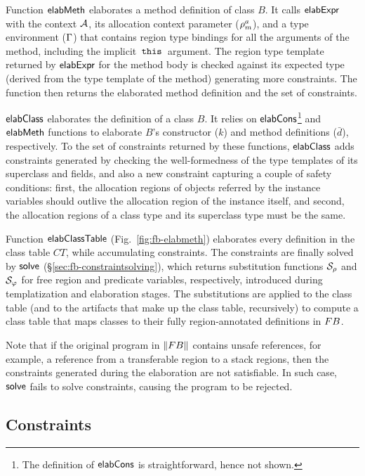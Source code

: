 Function ${\sf elabMeth}$ elaborates a method definition of class $B$. It
calls ${\sf elabExpr}$ with the context ${\mathcal{A}}$, its allocation context
parameter ($\rho^a_m$), and a type environment ($\Gamma$) that
contains region type bindings for all the arguments of the method,
including the implicit $\,{\tt this}\,$ argument. The region type template
returned by ${\sf elabExpr}$ for the method body is checked against its
expected type (derived from the type template of the method)
generating more constraints. The function then returns the elaborated
method definition and the set of constraints.

${\sf elabClass}$ elaborates the definition of a class $B$. It relies on
${\sf elabCons}$\footnote{The definition of ${\sf elabCons}$ is straightforward,
hence not shown.} and ${\sf elabMeth}$ functions to elaborate $B$'s
constructor ($k$) and method definitions ($\bar{d}$), respectively. To
the set of constraints returned by these functions, ${\sf elabClass}$ adds
constraints generated by checking the well-formedness of the type
templates of its superclass and fields, and also a new constraint
capturing a couple of safety conditions: first, the allocation regions
of objects referred by the instance variables should outlive the
allocation region of the instance itself, and second, the allocation
regions of a class type and its superclass type must be the same.

Function ${\sf elabClassTable}$ (Fig.~\ref{fig:fb-elabmeth}) elaborates
every definition in the class table $CT$, while accumulating
constraints. The constraints are finally solved by ${\sf solve}$
(\S\ref{sec:fb-constraintsolving}), which returns substitution
functions $\mathcal{S}_\rho$ and $\mathcal{S}_\varphi$ for free region and
predicate variables, respectively, introduced during templatization
and elaboration stages. The substitutions are applied to the class
table (and to the artifacts that make up the class table, recursively)
to compute a class table that maps classes to their fully
region-annotated definitions in ${\sc FB}$.

Note that if the original program in $\left\| {\sc FB} \right\|$ contains unsafe
references, for example, a reference from a transferable region to a
stack regions, then the constraints generated during the elaboration
are not satisfiable. In such case, ${\sf solve}$ fails to solve
constraints, causing the program to be rejected.

\subsection{Constraints}
\label{sec:fb-constraintsem}

